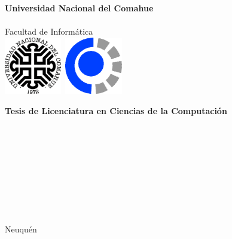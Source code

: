 
\titlepage

\begin{center}
\ \\
\ \\
\vspace{-1cm}
 

\ \\

\vspace{0.5cm}
{\Large{\bf \sc Universidad Nacional del Comahue}}\\

\ \\
{\Large { \sc Facultad de Informática}}\\

\vspace{-2.5cm}
\mbox{\hspace{-1cm}\includegraphics[width=2.5cm,height=2.5cm]{Imagenes/unc.png}\hspace{13cm} \includegraphics[width=2.5cm,height=2.5cm]{Imagenes/fai.png}}


\vspace{6cm}
{\Large {\bf\sc Tesis de Licenciatura en Ciencias de la Computaci\'on}}\\
\ \\
\ \\
{\LARGE {\bf \titulotesis}}\\
\vspace{3cm}


{\Large \nombretesista}\\
\vspace{2cm}

{\Large \nombredirector}\\
\ \\
\if\nombrecodirector \ 
\else
{\Large \nombrecodirector}
\fi

\vfill
{\Large {\sc Neuqu\'en}\hspace{6cm}{\sc Argentina}}\\
\ \\

{\Large \the\year}\\

\end{center}
\vfill
\pagebreak

